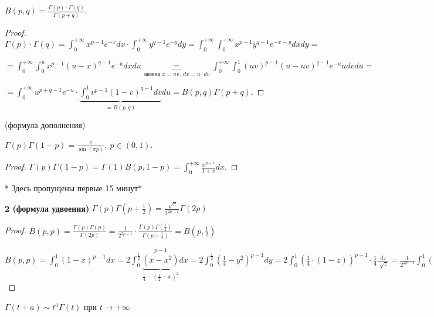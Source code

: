 \begin{theorem}
    $B(p, q) = \frac{\Gamma(p) \cdot \Gamma(q)}{\Gamma(p+q)}$.
\end{theorem}
\begin{proof}
    $\Gamma(p) \cdot \Gamma(q) = \int_{0}^{+\infty} { x^{p-1} e^{-x} dx } \cdot \int_{0}^{+\infty} { y^{q-1} e^{-y} dy } = \int_0^{+\infty} { \int_{0}^{+\infty} { x^{p-1} y^{q-1} e^{-x-y} dx } dy } =$
    
    $= \int_{0}^{+\infty} { \int_{0}^{u} { x^{p-1} (u - x)^{q-1} e^{-u} dx } du } \underbrace{=}_{\text {замена } x = uv, \ dx = u \cdot dv} \int_{0}^{+\infty} { \int_{0}^{1} { (uv)^{p-1} (u - uv)^{q-1} e^{-u} u dv } du } =$
    
    $= \int_{0}^{+\infty} { u^{p+q-1} e^{-u} \cdot \underbrace{\int_{0}^{1} { v^{p-1} (1-v)^{q-1} dv }}_{= B(p, q)} du } = B(p, q) \Gamma(p + q)$.
\end{proof}

\begin{consequence}
    (формула дополнения)

    $\Gamma(p) \Gamma(1-p) = \frac{\pi}{\sin(\pi p)}, \ p \in (0, 1)$.
\end{consequence}
\begin{proof}
    $\Gamma(p) \Gamma(1 - p) = \Gamma(1) B(p, 1 - p) = \int_{0}^{+\infty} { \frac{x^{p-1}}{1+x} dx }$.
\end{proof}


* Здесь пропущены первые 15 минут*

\begin{consequence} \textbf{2 (формула удвоения)}
    $\Gamma(p)\Gamma(p + \frac{1}{2}) = \frac{\sqrt[]{\pi}}{2^{2p - 1}}\Gamma(2p)$
\end{consequence}

\begin{proof}
    $B(p, p) = \frac{\Gamma(p)\Gamma(p)}{\Gamma(2p)} = \frac{1}{2^{2p-1}}\cdot\frac{\Gamma(p)\Gamma(\frac{1}{2})}{\Gamma(p + \frac{1}{2})} = B(p, \frac{1}{2})$

    $B(p, p) = \int_{0}^{1}(1 - x)^{p -1}dx = 2 \int_{0}^{\frac{1}{2}}\underbrace{(x - x^2)}_{\frac{1}{4} - (\frac{1}{2}-x)^2}^{p-1}dx = 2 \int_{0}^{\frac{1}{2}}(\frac{1}{4} - y^2)^{p-1}dy = 2\int_{0}^{1}(\frac{1}{4}\cdot(1 - z))^{p-1} \cdot \frac{1}{4}\frac{dz}{\sqrt[]{z}} = \frac{1}{2^{2p-1}}\int_{0}^{1}(1 - z)^{p-1}z^{\frac{-1}{2}}dz$

\end{proof}

\begin{theorem}
    $\Gamma(t + a) \sim t^a \Gamma(t)$ при $t \to +\infty$
\end{theorem}

